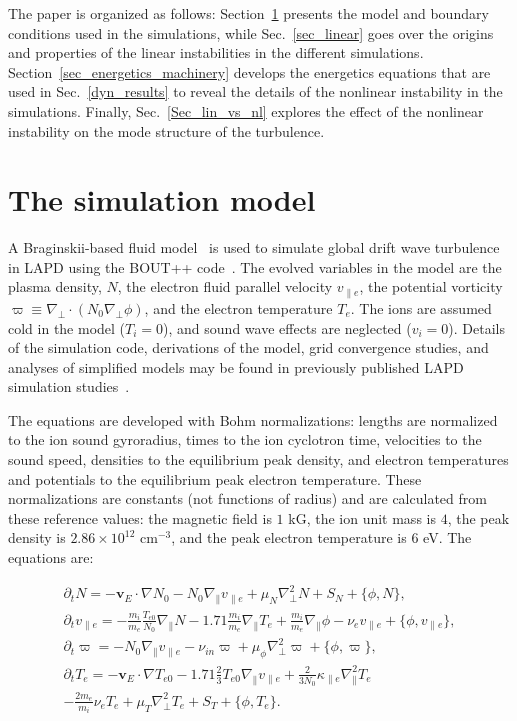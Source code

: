 \documentclass[showpacs,preprintnumbers,amsmath,amssymb,superscriptaddress,aip]{revtex4-1}
\def\beqar{\begin{eqnarray}}
\def\eeqar{\end{eqnarray}}
\newcommand{\pdt}{\partial_t}
\def\grad{\nabla}
\newcommand{\gradpar}{\grad_\parallel}
\newcommand{\gradperp}{\grad_\perp}
\newcommand{\vpe}{v_{\parallel e}}
\newcommand{\nue}{\nu_{e}}
\newcommand{\nuin}{\nu_{in}}
\newcommand{\kpe}{\kappa_{\parallel e}}
\newcommand{\fmie}{\frac{m_i}{m_e}}
\begin{document}
The paper is organized as follows: Section~\ref{dw_model} presents the model and boundary conditions used in the simulations, while 
Sec.~\ref{sec_linear} goes over the origins and properties of the linear instabilities in the different simulations.
Section~\ref{sec_energetics_machinery} develops the energetics equations that are used in Sec.~\ref{dyn_results} to reveal the details of the nonlinear instability in the simulations.
Finally, Sec.~\ref{Sec_lin_vs_nl} explores the effect of the nonlinear instability on the mode structure of the turbulence.



\section{The simulation model}
\label{dw_model}

A Braginskii-based fluid model~\cite{Braginskii1965} is used to simulate global drift wave turbulence in LAPD using the BOUT++ code~\cite{dudson2009}. 
The evolved variables in the model are the plasma density, $N$, the electron fluid parallel velocity $\vpe$, the potential vorticity $\varpi \equiv \gradperp \cdot (N_0 \gradperp \phi)$,
and the electron temperature $T_e$. The ions are assumed cold in the
model ($T_i = 0$), and sound wave effects are neglected ($v_i = 0$). Details of the simulation code, derivations of the model, grid convergence studies, and analyses of simplified models
may be found in previously published LAPD simulation studies~\cite{Popovich2010a,Popovich2010b,Umansky2011,friedman2012,friedman2012b}.

The equations are developed with Bohm normalizations: lengths are
normalized to the ion sound gyroradius, times to the ion
cyclotron time, velocities to the sound speed, densities to the equilibrium peak density, and electron
temperatures and potentials to the equilibrium peak electron temperature. These normalizations are constants (not functions of radius) and are calculated from these reference values:
the magnetic field is $1$ kG, the ion unit mass is $4$, the peak density is $2.86 \times 10^{12}$ cm$^{-3}$, and the peak electron temperature
is $6$ eV. The equations are:

\beqar
\label{ni_eq}
\pdt N = - {\mathbf v_E} \cdot \grad N_0 - N_0 \gradpar \vpe + \mu_N \gradperp^2 N + S_N + \{\phi,N\}, \\
\label{ve_eq}
\pdt \vpe = - \fmie \frac{T_{e0}}{N_0} \gradpar N - 1.71 \fmie \gradpar T_e  + \fmie \gradpar \phi - \nue \vpe + \{\phi,\vpe \}, \\
\label{rho_eq}
\pdt \varpi = - N_0 \gradpar \vpe  - \nuin \varpi + \mu_\phi \gradperp^2 \varpi + \{\phi,\varpi \}, \\
\label{te_eq}
\pdt T_e = - {\mathbf v_E} \cdot \grad T_{e0} - 1.71 \frac{2}{3} T_{e0} \gradpar \vpe + \frac{2}{3 N_0} \kpe \gradpar^2 T_e  \nonumber \\
- \frac{2 m_e}{m_i} \nue T_e  + \mu_T \gradperp^2 T_e +  S_T + \{\phi,T_e\}.
\eeqar
\end{document}
